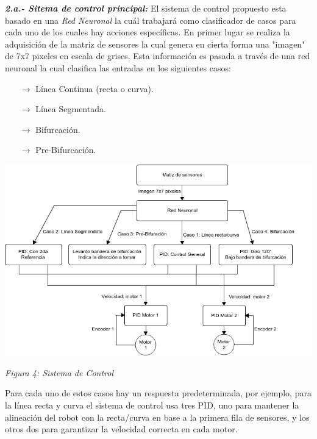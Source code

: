 \documentclass[10pt,twocolumn,legalpaper,draft]{article}
\begin{document}

\centerline{\Large{\textbf{}}}
\vspace{0,8em}

\textit{\textbf{2.a.- Sitema de control principal:}}
El sistema de control propuesto esta basado en una \emph{Red Neuronal} la cuál trabajará como clasificador de casos para cada uno de los cuales hay acciones específicas.\newline
En primer lugar se realiza la adquisición de la matriz de sensores la cual genera en cierta forma una "imagen" de 7x7 pixeles en escala de grises. Esta información es pasada a través de una red neuronal la cual clasifica las entradas en los siguientes casos:

\begin{itemize}
	\item[$\rightarrow$] Línea Continua (recta o curva).
	\item[$\rightarrow$] Línea Segmentada.
	\item[$\rightarrow$] Bifurcación.
	\item[$\rightarrow$] Pre-Bifurcación.
\end{itemize}

\begin{center}
	\includegraphics[scale=0.31]{Software}
	
	\textit{Figura 4: Sistema de Control}
\end{center}

Para cada uno de estos casos hay un respuesta predeterminada, por ejemplo, para la línea recta y curva el sistema de control usa tres PID, uno para mantener la alineación del robot con la recta/curva en base a la primera fila de sensores, y los otros dos para garantizar la velocidad correcta en cada motor.\newline
\end{document}
